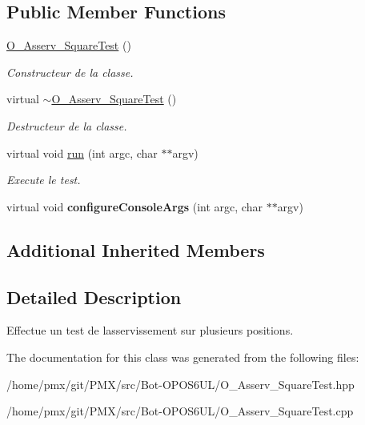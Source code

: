 \subsection*{Public Member Functions}
\begin{DoxyCompactItemize}
\item 
\mbox{\label{classO__Asserv__SquareTest_a9a949cb8372055c755ee42355e61d734}} 
\hyperlink{classO__Asserv__SquareTest_a9a949cb8372055c755ee42355e61d734}{O\+\_\+\+Asserv\+\_\+\+Square\+Test} ()
\begin{DoxyCompactList}\small\item\em Constructeur de la classe. \end{DoxyCompactList}\item 
\mbox{\label{classO__Asserv__SquareTest_aa577ea67151d97267dc64dee8c20279e}} 
virtual \hyperlink{classO__Asserv__SquareTest_aa577ea67151d97267dc64dee8c20279e}{$\sim$\+O\+\_\+\+Asserv\+\_\+\+Square\+Test} ()
\begin{DoxyCompactList}\small\item\em Destructeur de la classe. \end{DoxyCompactList}\item 
\mbox{\label{classO__Asserv__SquareTest_a16a0bf866c8070611cfa8952e3ef64d8}} 
virtual void \hyperlink{classO__Asserv__SquareTest_a16a0bf866c8070611cfa8952e3ef64d8}{run} (int argc, char $\ast$$\ast$argv)
\begin{DoxyCompactList}\small\item\em Execute le test. \end{DoxyCompactList}\item 
\mbox{\label{classO__Asserv__SquareTest_a4d756e123d564a73e8b46649f8c010d9}} 
virtual void {\bfseries configure\+Console\+Args} (int argc, char $\ast$$\ast$argv)
\end{DoxyCompactItemize}
\subsection*{Additional Inherited Members}


\subsection{Detailed Description}
Effectue un test de l\textquotesingle{}asservissement sur plusieurs positions. 

The documentation for this class was generated from the following files\+:\begin{DoxyCompactItemize}
\item 
/home/pmx/git/\+P\+M\+X/src/\+Bot-\/\+O\+P\+O\+S6\+U\+L/O\+\_\+\+Asserv\+\_\+\+Square\+Test.\+hpp\item 
/home/pmx/git/\+P\+M\+X/src/\+Bot-\/\+O\+P\+O\+S6\+U\+L/O\+\_\+\+Asserv\+\_\+\+Square\+Test.\+cpp\end{DoxyCompactItemize}
